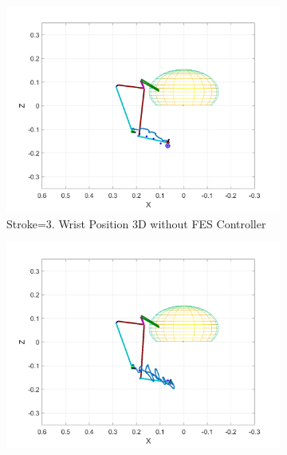 \newpage
\begin{landscape}
    \begin{figure}[ht]
        \centering
        \begin{subfigure}[b]{0.33\textwidth}
            \centering
            \includegraphics[width=\linewidth]{Pictures/Results/Controller/Stroke3/20_wp_nofes.png}
            \caption{Stroke=3. Wrist Position 3D without FES Controller}
        \end{subfigure}%
        \hfill
        \begin{subfigure}[b]{0.33\textwidth}
            \centering
            \includegraphics[width=\linewidth]{Pictures/Results/Controller/Stroke3/20_wp_fes.png}

\end{subfigure}
\end{figure}
\end{landscape}
